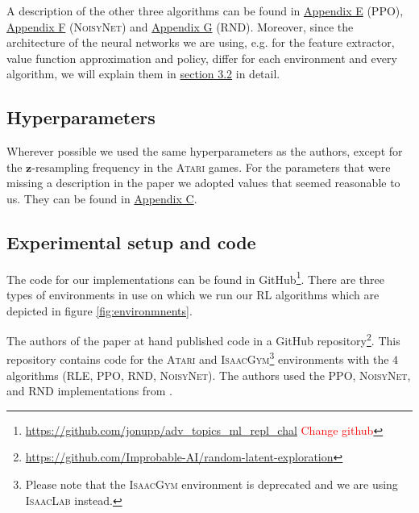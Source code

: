 \documentclass[10pt]{article} %
\begin{document}
\noindent A description of the other three algorithms can be found in \hyperlink{link-ppo}{Appendix E} (\textsc{PPO}), \hyperlink{link-noisynet}{Appendix F} (\textsc{NoisyNet}) and \hyperlink{link-rnd}{Appendix G} (\textsc{RND}). Moreover, since the architecture of the neural networks we are using, e.g. for the feature extractor, value function approximation and policy, differ for each environment and every algorithm, we will explain them in \hyperlink{experimental-setup}{section 3.2} in detail.

\hypertarget{hyperparameter-subsection}{\subsection{Hyperparameters}}

Wherever possible we used the same hyperparameters as the authors, except for the $\textbf{z}$-resampling frequency in the \textsc{Atari} games. For the parameters that were missing a description in the paper we adopted values that seemed reasonable to us. They can be found in \hyperlink{appendix-hyperparams}{Appendix C}.

\hypertarget{experimental-setup}{\subsection{Experimental setup and code}}

The code for our implementations can be found in GitHub\footnote{\href{https://github.com/jonupp/adv_topics_ml_repl_chal}{https://github.com/jonupp/adv\_topics\_ml\_repl\_chal} \textcolor{red}{Change github}}. There are three types of environments in use on which we run our RL algorithms which are depicted in figure \ref{fig:environmnents}. 

\noindent The authors of the paper at hand published code in a GitHub repository\footnote{\href{https://github.com/Improbable-AI/random-latent-exploration}{https://github.com/Improbable-AI/random-latent-exploration}}. This repository contains code for the \textsc{Atari} and \textsc{IsaacGym}\footnote{Please note that the \textsc{IsaacGym} environment is deprecated and we are using \textsc{IsaacLab} instead.} environments with the $4$ algorithms (\textsc{RLE}, \textsc{PPO}, \textsc{RND}, \textsc{NoisyNet}). The authors used the \textsc{PPO}, \textsc{NoisyNet}, and \textsc{RND} implementations from \cite{clearnrl-paper}.
\end{document}
